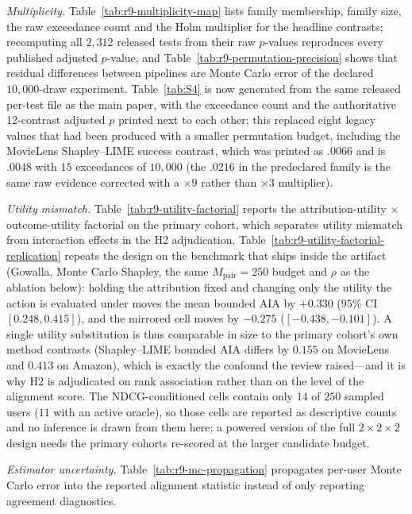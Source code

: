 \documentclass[manuscript,screen,anonymous]{acmart}
\begin{document}
\emph{Multiplicity.} Table~\ref{tab:r9-multiplicity-map} lists family
membership, family size, the raw exceedance count and the Holm multiplier for the
headline contrasts; recomputing all $2{,}312$ released tests from their raw
$p$-values reproduces every published adjusted $p$-value, and Table~\ref{tab:r9-permutation-precision} shows that residual differences between
pipelines are Monte Carlo error of the declared $10{,}000$-draw experiment.
Table~\ref{tab:S4} is now generated from the same released per-test file as the
main paper, with the exceedance count and the authoritative 12-contrast adjusted
$p$ printed next to each other; this replaced eight legacy values that had been
produced with a smaller permutation budget, including the MovieLens
Shapley--LIME success contrast, which was printed as $.0066$ and is $.0048$ with
$15$ exceedances of $10{,}000$ (the $.0216$ in the predeclared family is the
same raw evidence corrected with a $\times9$ rather than $\times3$ multiplier).

\emph{Utility mismatch.} Table~\ref{tab:r9-utility-factorial} reports
the attribution-utility $\times$ outcome-utility factorial on the primary cohort,
which separates utility mismatch from interaction effects in the H2 adjudication.
Table~\ref{tab:r9-utility-factorial-replication} repeats the design on the benchmark
that ships inside the artifact (Gowalla, Monte Carlo Shapley, the same
$M_{\mathrm{pair}}=250$ budget and $\rho$ as the ablation below): holding the
attribution fixed and changing only the utility the action is evaluated under moves
the mean bounded AIA by $+0.330$ ($95\%$ CI $[0.248,0.415]$), and the mirrored cell
moves by $-0.275$ ($[-0.438,-0.101]$). A single utility substitution is thus
comparable in size to the primary cohort's own method contrasts (Shapley--LIME
bounded AIA differs by $0.155$ on MovieLens and $0.413$ on Amazon), which is exactly
the confound the review raised---and it is why H2 is adjudicated on rank association
rather than on the level of the alignment score. The NDCG-conditioned cells contain
only $14$ of $250$ sampled users ($11$ with an active oracle), so those cells are
reported as descriptive counts and no inference is drawn from them here; a powered
version of the full $2\times2\times2$ design needs the primary cohorts re-scored at
the larger candidate budget.

\emph{Estimator uncertainty.}
Table~\ref{tab:r9-mc-propagation} propagates per-user Monte Carlo error into the
reported alignment statistic instead of only reporting agreement diagnostics.
\end{document}
